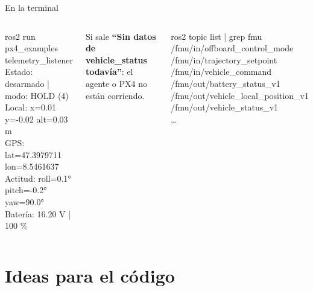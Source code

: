 \documentclass[aspectratio=169,10pt]{beamer}
\begin{document}
\begin{frame}{En la terminal}
  \begin{columns}[t]
    \begin{terminal}{ros2 run px4\_examples telemetry\_listener}
Estado: desarmado | modo: HOLD (4)\\
Local: x=0.01 y=-0.02 alt=0.03 m\\
GPS: lat=47.3979711 lon=8.5461637\\
Actitud: roll=0.1° pitch=-0.2° yaw=90.0°\\
Batería: 16.20 V | 100 \%
    \end{terminal}
    \small Si sale \textbf{``Sin datos de vehicle\_status todavía''}: el agente o PX4 no están corriendo.
    \begin{terminal}{ros2 topic list | grep fmu}
/fmu/in/offboard\_control\_mode\\
/fmu/in/trajectory\_setpoint\\
/fmu/in/vehicle\_command\\
/fmu/out/battery\_status\_v1\\
/fmu/out/vehicle\_local\_position\_v1\\
/fmu/out/vehicle\_status\_v1\\
\ldots
    \end{terminal}
  \end{columns}
\end{frame}

\section{Ideas para el código}
\end{document}
